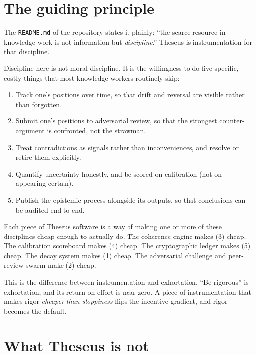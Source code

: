 \documentclass[11pt,letterpaper]{article}
\newcommand{\file}[1]{\texttt{#1}}
\begin{document}
\section{The guiding principle}

The \file{README.md} of the repository states it plainly: ``the scarce resource in knowledge work is not information but \emph{discipline}.'' Theseus is instrumentation for that discipline.

Discipline here is not moral discipline. It is the willingness to do five specific, costly things that most knowledge workers routinely skip:

\begin{enumerate}[leftmargin=1.5em,itemsep=0.25em]
\item Track one's positions over time, so that drift and reversal are visible rather than forgotten.
\item Submit one's positions to adversarial review, so that the strongest counter-argument is confronted, not the strawman.
\item Treat contradictions as signals rather than inconveniences, and resolve or retire them explicitly.
\item Quantify uncertainty honestly, and be scored on calibration (not on appearing certain).
\item Publish the epistemic process alongside its outputs, so that conclusions can be audited end-to-end.
\end{enumerate}

Each piece of Theseus software is a way of making one or more of these disciplines cheap enough to actually do. The coherence engine makes (3) cheap. The calibration scoreboard makes (4) cheap. The cryptographic ledger makes (5) cheap. The decay system makes (1) cheap. The adversarial challenge and peer-review swarm make (2) cheap.

This is the difference between instrumentation and exhortation. ``Be rigorous'' is exhortation, and its return on effort is near zero. A piece of instrumentation that makes rigor \emph{cheaper than sloppiness} flips the incentive gradient, and rigor becomes the default.

\section{What Theseus is not}
\end{document}
